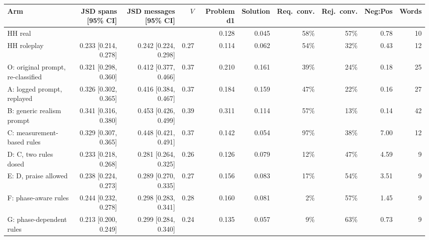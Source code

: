 \begin{tabular}{lrrrrrrrrr}
\toprule
Arm & JSD spans [95\% CI] & JSD messages [95\% CI] & $V$ & Problem d1 & Solution & Req.\ conv. & Rej.\ conv. & Neg:Pos & Words \\
\midrule
HH real &  &  &  & 0.128 & 0.045 & 58\% & 57\% & 0.78 & 10 \\
HH roleplay & 0.233 [0.214, 0.278] & 0.242 [0.224, 0.298] & 0.27 & 0.114 & 0.062 & 54\% & 32\% & 0.43 & 12 \\
\midrule
O: original prompt, re-classified & 0.321 [0.298, 0.360] & 0.412 [0.377, 0.466] & 0.37 & 0.210 & 0.161 & 39\% & 24\% & 0.18 & 25 \\
A: logged prompt, replayed & 0.326 [0.302, 0.365] & 0.416 [0.384, 0.467] & 0.37 & 0.184 & 0.159 & 47\% & 22\% & 0.16 & 27 \\
B: generic realism prompt & 0.341 [0.316, 0.380] & 0.453 [0.426, 0.499] & 0.39 & 0.311 & 0.114 & 57\% & 13\% & 0.14 & 42 \\
C: measurement-based rules & 0.329 [0.307, 0.365] & 0.448 [0.421, 0.491] & 0.37 & 0.142 & 0.054 & 97\% & 38\% & 7.00 & 12 \\
D: C, two rules dosed & 0.233 [0.218, 0.268] & 0.281 [0.264, 0.325] & 0.26 & 0.126 & 0.079 & 12\% & 47\% & 4.59 & 9 \\
E: D, praise allowed & 0.238 [0.224, 0.273] & 0.289 [0.270, 0.335] & 0.27 & 0.156 & 0.083 & 17\% & 54\% & 3.51 & 9 \\
F: phase-aware rules & 0.244 [0.232, 0.278] & 0.298 [0.283, 0.341] & 0.28 & 0.160 & 0.081 & 2\% & 57\% & 1.45 & 9 \\
G: phase-dependent rules & 0.213 [0.200, 0.249] & 0.299 [0.284, 0.340] & 0.24 & 0.135 & 0.057 & 9\% & 63\% & 0.73 & 9 \\
\bottomrule
\end{tabular}
